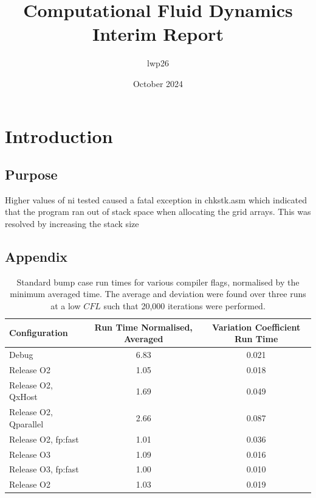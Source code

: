 \documentclass{article}
\begin{document}
\title{Computational Fluid Dynamics \\
    \large Interim Report}
\author{lwp26}
\date{October 2024}
\maketitle 

\section{Introduction}

\subsection{Purpose}


Higher values of ni tested caused a fatal exception in chkstk.asm which indicated that the program ran out of stack space when allocating the grid arrays.
This was resolved by increasing the stack size 

\subsection{Appendix}

\begin{table}[H]
    \centering
    \begin{tabular}{lcc}
        \toprule
        \textbf{Configuration} & \textbf{Run Time Normalised, Averaged } & \textbf{Variation Coefficient Run Time} \\
        \midrule
        Debug & 6.83 & 0.021 \\
        Release O2 & 1.05 & 0.018 \\
        Release O2, QxHost & 1.69 & 0.049 \\
        Release O2, Qparallel & 2.66 & 0.087 \\
        Release O2, fp:fast & 1.01 & 0.036 \\
        Release O3 & 1.09 & 0.016 \\
        Release O3, fp:fast & 1.00 & 0.010 \\
        Release O2 & 1.03 & 0.019 \\
        \bottomrule
    \end{tabular}
    \caption{Standard bump case run times for various compiler flags, normalised by the minimum averaged time. The average and deviation were found over three runs at a low $CFL$ such that 20,000 iterations were performed.}
    \label{tab:performance}
\end{table}
\end{document}
